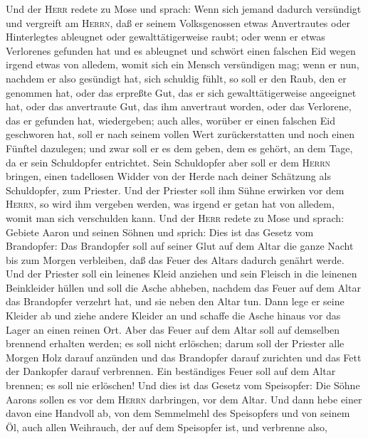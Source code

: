  Und der \textsc{Herr} redete zu Mose und sprach:
 Wenn sich jemand dadurch versündigt und vergreift am
\textsc{Herrn}, daß er seinem Volksgenossen etwas Anvertrautes oder
Hinterlegtes ableugnet oder gewalttätigerweise raubt; 
oder wenn er etwas Verlorenes gefunden hat und es ableugnet und schwört
einen falschen Eid wegen irgend etwas von alledem, womit sich ein Mensch
versündigen mag;  wenn er nun, nachdem er also gesündigt
hat, sich schuldig fühlt, so soll er den Raub, den er genommen hat, oder
das erpreßte Gut, das er sich gewalttätigerweise angeeignet hat, oder
das anvertraute Gut, das ihm anvertraut worden, oder das Verlorene, das
er gefunden hat, wiedergeben;  auch alles, worüber er
einen falschen Eid geschworen hat, soll er nach seinem vollen Wert
zurückerstatten und noch einen Fünftel dazulegen; und zwar soll er es
dem geben, dem es gehört, an dem Tage, da er sein Schuldopfer
entrichtet.  Sein Schuldopfer aber soll er dem
\textsc{Herrn} bringen, einen tadellosen Widder von der Herde nach
deiner Schätzung als Schuldopfer, zum Priester.  Und der
Priester soll ihm Sühne erwirken vor dem \textsc{Herrn}, so wird ihm
vergeben werden, was irgend er getan hat von alledem, womit man sich
verschulden kann.  Und der \textsc{Herr} redete zu Mose
und sprach: Gebiete Aaron und seinen Söhnen und sprich: 
Dies ist das Gesetz vom Brandopfer: Das Brandopfer soll auf seiner Glut
auf dem Altar die ganze Nacht bis zum Morgen verbleiben, daß das Feuer
des Altars dadurch genährt werde.  Und der Priester soll
ein leinenes Kleid anziehen und sein Fleisch in die leinenen Beinkleider
hüllen und soll die Asche abheben, nachdem das Feuer auf dem Altar das
Brandopfer verzehrt hat, und sie neben den Altar tun. 
Dann lege er seine Kleider ab und ziehe andere Kleider an und schaffe
die Asche hinaus vor das Lager an einen reinen Ort.  Aber
das Feuer auf dem Altar soll auf demselben brennend erhalten werden; es
soll nicht erlöschen; darum soll der Priester alle Morgen Holz darauf
anzünden und das Brandopfer darauf zurichten und das Fett der Dankopfer
darauf verbrennen.  Ein beständiges Feuer soll auf dem
Altar brennen; es soll nie erlöschen!  Und dies ist das
Gesetz vom Speisopfer: Die Söhne Aarons sollen es vor dem \textsc{Herrn}
darbringen, vor dem Altar.  Und dann hebe einer davon
eine Handvoll ab, von dem Semmelmehl des Speisopfers und von seinem Öl,
auch allen Weihrauch, der auf dem Speisopfer ist, und verbrenne also,
